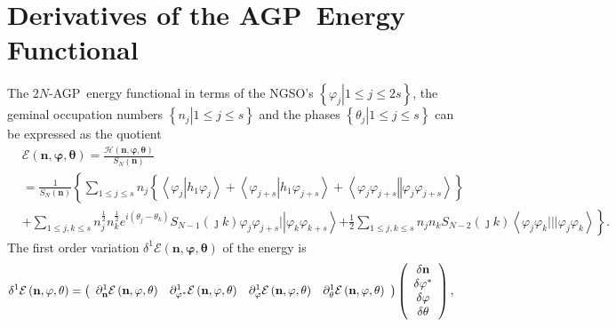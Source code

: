 \documentclass[aps,preprint]{revtex4}%
\begin{document}
\section{Derivatives of the AGP\ Energy Functional\label{variational}}

The $2N$-AGP\ energy functional in terms of the NGSO's $\left\{  \left.
\varphi_{j}\right\vert 1\leq j\leq2s\right\}  $, the geminal occupation
numbers $\left\{  \left.  n_{j}\right\vert 1\leq j\leq s\right\}  $ and the
phases $\left\{  \left.  \theta_{j}\right\vert 1\leq j\leq s\right\}  $ can be
expressed as the quotient%
\begin{align}
&  \mathcal{E}\left(  \mathbf{n},\mathbf{\varphi},\mathbf{\theta}\right)
=\frac{\mathcal{H}\left(  \mathbf{n},\mathbf{\varphi},\mathbf{\theta}\right)
}{S_{N}\left(  \mathbf{n}\right)  }\nonumber\\
&  =\frac{1}{S_{N}\left(  \mathbf{n}\right)  }\left\{  \sum_{1\leq j\leq
s}n_{j}\left\{  \left\langle \varphi_{j}\left\vert h_{1}\varphi_{j}\right.
\right\rangle +\left\langle \varphi_{j+s}\left\vert h_{1}\varphi_{j+s}\right.
\right\rangle +\left\langle \varphi_{j}\varphi_{j+s}\left\Vert \varphi
_{j}\varphi_{j+s}\right.  \right\rangle \right\}  \right. \nonumber\\
&  +\sum_{1\leq j,k\leq s}n_{j}^{\frac{1}{2}}n_{k}^{\frac{1}{2}}e^{i\left(
\theta_{j}-\theta_{k}\right)  }S_{N-1}\left(  \jmath k\right)  \varphi
_{j}\varphi_{j+s}|\left\vert \varphi_{k}\varphi_{k+s}\right\rangle \left.
+\frac{1}{2}\sum_{1\leq j,k\leq s}n_{j}n_{k}S_{N-2}\left(  \jmath k\right)
\left\langle \varphi_{j}\varphi_{k}|||\varphi_{j}\varphi_{k}\right\rangle
\right\}  .
\end{align}
The first order variation $\delta^{1}\mathcal{E}\left(  \mathbf{n}%
,\mathbf{\varphi},\mathbf{\theta}\right)  $ of the energy is
\begin{equation}
\delta^{1}\mathcal{E}\left(  \mathbf{n},\mathbf{\varphi},\mathbf{\theta
}\right)  =\left(
\begin{array}
[c]{cccc}%
\partial_{\mathbf{n}}^{1}\mathcal{E}\left(  \mathbf{n},\mathbf{\varphi
},\mathbf{\theta}\right)  & \partial_{\mathbf{\varphi}^{\ast}}^{1}%
\mathcal{E}\left(  \mathbf{n},\mathbf{\varphi},\mathbf{\theta}\right)  &
\partial_{\mathbf{\varphi}}^{1}\mathcal{E}\left(  \mathbf{n},\mathbf{\varphi
},\mathbf{\theta}\right)  & \partial_{\mathbf{\theta}}^{1}\mathcal{E}\left(
\mathbf{n},\mathbf{\varphi},\mathbf{\theta}\right)
\end{array}
\right)  \left(
\begin{array}
[c]{c}%
\delta\mathbf{n}\\
\delta\mathbf{\varphi}^{\ast}\\
\delta\mathbf{\varphi}\\
\delta\mathbf{\theta}%
\end{array}
\right)  ,
\end{equation}
\end{document}
